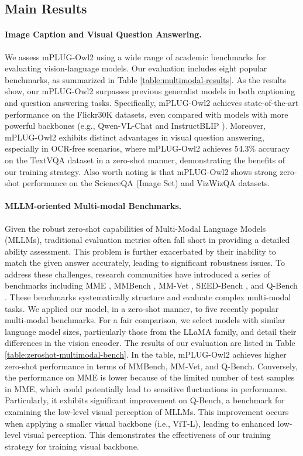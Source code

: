 \documentclass[10pt,twocolumn,letterpaper]{article}
\newcommand{\modelname}{mPLUG-Owl2\xspace}
\begin{document}
\subsection{Main Results}
\paragraph{Image Caption and Visual Question Answering.}
We assess \modelname using a wide range of academic benchmarks for evaluating vision-language models. Our evaluation includes eight popular benchmarks, as summarized in Table \ref{table:multimodal-results}. As the results show, our \modelname surpasses previous generalist models in both captioning and question answering tasks. Specifically, \modelname achieves state-of-the-art performance on the Flickr30K datasets, even compared with models with more powerful backbones (e.g., Qwen-VL-Chat \cite{Bai2023QwenVL} and InstructBLIP \cite{Dai2023InstructBLIP}). Moreover, \modelname exhibits distinct advantages in visual question answering, especially in OCR-free scenarios, where \modelname achieves 54.3\% accuracy on the TextVQA dataset in a zero-shot manner, demonstrating the benefits of our training strategy. Also worth noting is that \modelname shows strong zero-shot performance on the ScienceQA (Image Set) and VizWizQA datasets.


\paragraph{MLLM-oriented Multi-modal Benchmarks.} 
Given the robust zero-shot capabilities of Multi-Modal Language Models (MLLMs), traditional evaluation metrics often fall short in providing a detailed ability assessment. This problem is further exacerbated by their inability to match the given answer accurately, leading to significant robustness issues. To address these challenges, research communities have introduced a series of benchmarks including MME \cite{fu2023mme}, MMBench \cite{liu2023mmbench}, MM-Vet \cite{yu2023mmvet}, SEED-Bench \cite{li2023seedbench}, and Q-Bench \cite{wu2023qbench}. These benchmarks systematically structure and evaluate complex multi-modal tasks. We applied our model, in a zero-shot manner, to five recently popular multi-modal benchmarks. For a fair comparison, we select models with similar language model sizes, particularly those from the LLaMA family, and detail their differences in the vision encoder. The results of our evaluation are listed in Table \ref{table:zeroshot-multimodal-bench}. In the table, \modelname achieves higher zero-shot performance in terms of MMBench, MM-Vet, and Q-Bench. Conversely, the performance on MME is lower because of the limited number of test samples in MME, which could potentially lead to sensitive fluctuations in performance. Particularly, it exhibits significant improvement on Q-Bench, a benchmark for examining the low-level visual perception of MLLMs. This improvement occurs when applying a smaller visual backbone (i.e., ViT-L), leading to enhanced low-level visual perception. This demonstrates the effectiveness of our training strategy for training visual backbone.
\end{document}
